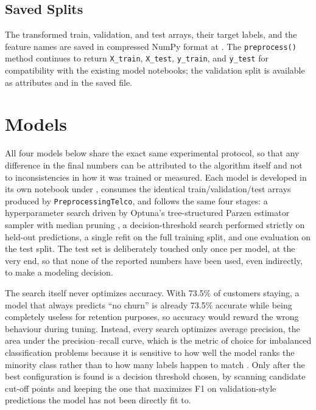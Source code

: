 \documentclass{article}
\begin{document}
\subsection{Saved Splits}
The transformed train, validation, and test arrays, their target labels, and the feature names are saved in compressed NumPy format at . The \texttt{preprocess()} method continues to return \texttt{X\_train}, \texttt{X\_test}, \texttt{y\_train}, and \texttt{y\_test} for compatibility with the existing model notebooks; the validation split is available as attributes and in the saved file.

\section{Models}

All four models below share the exact same experimental protocol, so that any difference in the final numbers can be attributed to the algorithm itself and not to inconsistencies in how it was trained or measured. Each model is developed in its own notebook under , consumes the identical train/validation/test arrays produced by \texttt{PreprocessingTelco}, and follows the same four stages: a hyperparameter search driven by Optuna's tree-structured Parzen estimator sampler with median pruning \cite{akiba2019optuna}, a decision-threshold search performed strictly on held-out predictions, a single refit on the full training split, and one evaluation on the test split. The test set is deliberately touched only once per model, at the very end, so that none of the reported numbers have been used, even indirectly, to make a modeling decision.

The search itself never optimizes accuracy. With 73.5\% of customers staying, a model that always predicts ``no churn'' is already 73.5\% accurate while being completely useless for retention purposes, so accuracy would reward the wrong behaviour during tuning. Instead, every search optimizes average precision, the area under the precision--recall curve, which is the metric of choice for imbalanced classification problems because it is sensitive to how well the model ranks the minority class rather than to how many labels happen to match \cite{davis2006precision}. Only after the best configuration is found is a decision threshold chosen, by scanning candidate cut-off points and keeping the one that maximizes F1 on validation-style predictions the model has not been directly fit to.
\end{document}
